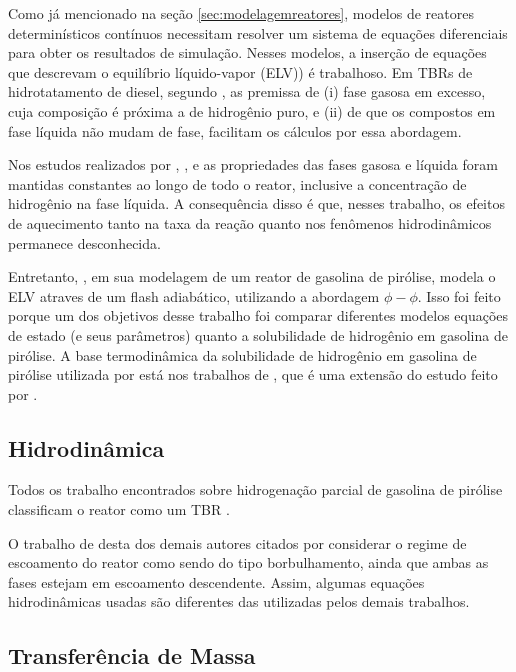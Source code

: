 Como já mencionado na seção \autoref{sec:modelagemreatores}, modelos de reatores
determinísticos contínuos necessitam resolver um sistema de equações
diferenciais para obter os resultados de simulação. Nesses modelos, a inserção
de equações que descrevam o equilíbrio líquido-vapor (ELV)) é trabalhoso. Em
TBRs de hidrotatamento de diesel, segundo , as premissa de (i)
fase gasosa em excesso, cuja composição é próxima a de hidrogênio puro, e (ii)
de que os compostos em fase líquida não mudam de fase, facilitam os cálculos por
essa abordagem.

Nos estudos realizados por ,
,  e
 as propriedades das fases gasosa e líquida foram
mantidas constantes ao longo de todo o reator, inclusive a concentração de
hidrogênio na fase líquida. A consequência disso é que, nesses trabalho, os
efeitos de aquecimento tanto na taxa da reação quanto nos fenômenos
hidrodinâmicos permanece desconhecida.

Entretanto, , em sua modelagem de um reator de
gasolina de pirólise, modela o ELV atraves de um flash
adiabático, utilizando a abordagem $\phi-\phi$. Isso foi feito porque um dos
objetivos desse trabalho foi comparar diferentes modelos equações de estado (e
seus parâmetros) quanto a solubilidade de hidrogênio em gasolina de pirólise. A
base termodinâmica da solubilidade de hidrogênio em gasolina de pirólise
utilizada por  está nos trabalhos de
, que é uma extensão do estudo feito por
.

\subsection{Hidrodinâmica} \label{sec:hidrodinamica}
Todos os trabalho encontrados sobre hidrogenação parcial de gasolina de pirólise
classificam o reator como um TBR \cite{Arpornwichanop2002, Authayanun2008,
Mostoufi2005a, Arpornwichanop2008, Rojas2014a}. 

O trabalho de  desta dos demais autores citados por
considerar o regime de escoamento do reator como sendo do tipo borbulhamento,
ainda que ambas as fases estejam em escoamento descendente. Assim, algumas
equações hidrodinâmicas usadas são diferentes das utilizadas pelos demais
trabalhos.

\subsection{Transferência de Massa} \label{sec:transferenciamassa}

